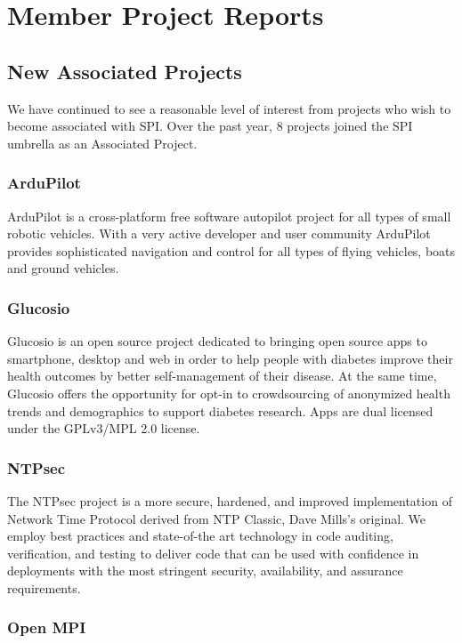 \documentclass[letterpaper]{report}
\begin{document}
\chapter{Member Project Reports}

\section{New Associated Projects}

We have continued to see a reasonable level of interest from projects
who wish to become associated with SPI. Over the past year, 8 projects
joined the SPI umbrella as an Associated Project.

\subsection{ArduPilot}

ArduPilot is a cross-platform free software autopilot project for all
types of small robotic vehicles. With a very active developer and user
community ArduPilot provides sophisticated navigation and control for
all types of flying vehicles, boats and ground vehicles.

\subsection{Glucosio}

Glucosio is an open source project dedicated to bringing open source
apps to smartphone, desktop and web in order to help people with
diabetes improve their health outcomes by better self-management of
their disease. At the same time, Glucosio offers the opportunity for
opt-in to crowdsourcing of anonymized health trends and demographics to
support diabetes research. Apps are dual licensed under the GPLv3/MPL
2.0 license.

\subsection{NTPsec}

The NTPsec project is a more secure, hardened, and improved
implementation of Network Time Protocol derived from NTP Classic, Dave
Mills's original. We employ best practices and state-of-the art
technology in code auditing, verification, and testing to deliver code
that can be used with confidence in deployments with the most stringent
security, availability, and assurance requirements.

\subsection{Open MPI}
\end{document}
